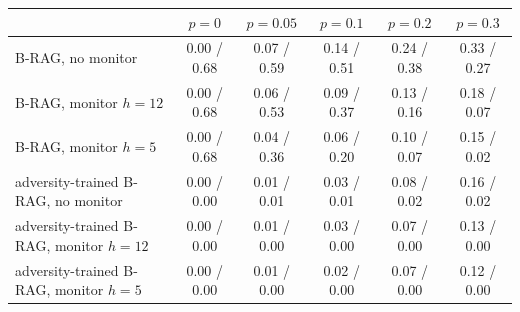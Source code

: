 \begin{tabular}{lccccc}
\toprule
 & $p{=}0$ & $p{=}0.05$ & $p{=}0.1$ & $p{=}0.2$ & $p{=}0.3$ \\
\midrule
B-RAG, no monitor & 0.00 / 0.68 & 0.07 / 0.59 & 0.14 / 0.51 & 0.24 / 0.38 & 0.33 / 0.27 \\
B-RAG, monitor $h{=}12$ & 0.00 / 0.68 & 0.06 / 0.53 & 0.09 / 0.37 & 0.13 / 0.16 & 0.18 / 0.07 \\
B-RAG, monitor $h{=}5$ & 0.00 / 0.68 & 0.04 / 0.36 & 0.06 / 0.20 & 0.10 / 0.07 & 0.15 / 0.02 \\
adversity-trained B-RAG, no monitor & 0.00 / 0.00 & 0.01 / 0.01 & 0.03 / 0.01 & 0.08 / 0.02 & 0.16 / 0.02 \\
adversity-trained B-RAG, monitor $h{=}12$ & 0.00 / 0.00 & 0.01 / 0.00 & 0.03 / 0.00 & 0.07 / 0.00 & 0.13 / 0.00 \\
adversity-trained B-RAG, monitor $h{=}5$ & 0.00 / 0.00 & 0.01 / 0.00 & 0.02 / 0.00 & 0.07 / 0.00 & 0.12 / 0.00 \\
\bottomrule
\end{tabular}
